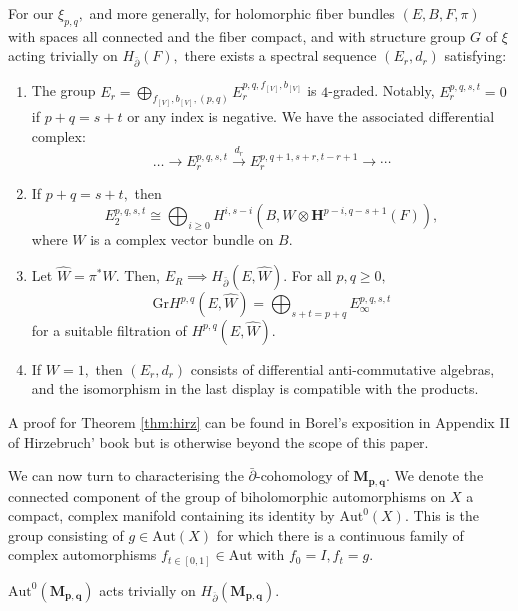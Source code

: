 \begin{theorem}\label{thm:hirz}
    For our $\xi_{p,q},$ and more generally, for holomorphic fiber bundles $(E,B,F, \pi)$ with spaces all connected and the fiber compact, and with structure group $G$ of $\xi$ acting trivially on $H_{\bar \partial}(F),$ there exists a spectral sequence $(E_r, d_r)$ satisfying:
    \begin{enumerate}
        \item The group $E_r = \bigoplus_{f_{[V]}, b_{[V]}, (p,q)} E^{p,q,f_{[V]}, b_{[V]}}_r$ is $4$-graded.
Notably, $E^{p,q,s,t}_r = 0$ if $p+q = s+t$ or any index is negative. We have the associated differential complex:
        \[
        \dots \rightarrow E^{p,q,s,t}_r \xrightarrow{d_r} E^{p,q+1,s+r,t-r+1}_r \rightarrow \cdots
        \]

        \item If $p+q = s+t,$ then
        \[
        E^{p,q,s,t}_2 \cong \bigoplus_{i \ge 0} H^{i, s-i}(B, W\otimes \mathbf{H}^{p-i, q-s+1}(F)),
        \]
        where $W$ is a complex vector bundle on $B.$

        \item Let $\hat W = \pi^*W.$ Then, $E_R \implies H_{\bar \partial}(E, \hat W).$ For all $p,q \ge 0,$
        \[
        \mathrm{Gr}H^{p,q}(E,\hat W) = \bigoplus_{s+t = p+q} E^{p,q,s,t}_\infty
        \]
        for a suitable filtration of $H^{p,q}(E,\hat W).$ 

        \item If $W=1,$ then $(E_r, d_r)$ consists of differential anti-commutative algebras, and the isomorphism in the last display is compatible with the products.
    \end{enumerate}
\end{theorem}

A proof for Theorem \ref{thm:hirz} can be found in Borel's exposition in Appendix II of Hirzebruch' book \cite{Hirzebruch} but is otherwise beyond the scope of this paper.

We can now turn to characterising the $\bar \partial$-cohomology of $\mathbf{M_{p,q}}.$ We denote the connected component of the group of biholomorphic automorphisms on $X$ a compact, complex manifold containing its identity by $\mathrm{Aut}^0(X).$ This is the group consisting of $g\in\mathrm{Aut}(X)$ for which there is a continuous family of complex automorphisms $f_{t\in [0,1]}\in \mathrm{Aut}$ with $f_0 = I, f_t = g.$ 

\begin{lemma}
    $\mathrm{Aut}^0(\mathbf{M_{p,q}})$ acts trivially on $H_{\overline\partial}(\mathbf{M_{p,q}}).$
\end{lemma}

